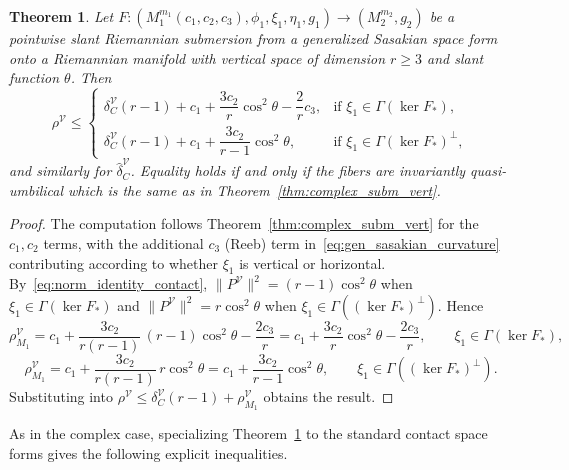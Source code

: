 \documentclass[11pt]{amsart}
\theoremstyle{plain}
\newtheorem{theorem}{Theorem}[section]
\theoremstyle{definition}
\theoremstyle{remark}
\newcommand{\calV}{\mathcal{V}}
\begin{document}
\begin{theorem}\label{thm:sasakian_subm_vert}
Let $F:(M_1^{m_1}(c_1,c_2,c_3),\phi_1,\xi_1,\eta_1,g_1)\to (M_2^{m_2},g_2)$ be a pointwise slant Riemannian submersion from a generalized Sasakian space form onto a Riemannian manifold with vertical space of dimension $r\ge 3$ and slant function $\theta$. Then
\begin{equation}\label{eq:sasakian_subm_vert}
\rho^{\calV} \le \begin{cases}
\delta_C^{\calV}(r-1) + c_1 + \dfrac{3c_2}{r}\cos^2\theta - \dfrac{2}{r}c_3, & \text{if } \xi_1 \in \Gamma(\ker F_*),\\[6pt]
\delta_C^{\calV}(r-1) + c_1 + \dfrac{3c_2}{r-1}\cos^2\theta, & \text{if } \xi_1 \in \Gamma(\ker F_*)^\perp,
\end{cases}
\end{equation}
and similarly for $\hat{\delta}_C^{\calV}$. Equality holds if and only if the fibers are invariantly quasi-umbilical 
 which is the same as in 
Theorem~\ref{thm:complex_subm_vert}.
\end{theorem}
\begin{proof}
The computation follows Theorem~\ref{thm:complex_subm_vert} for the
$c_1,c_2$ terms, with the additional $c_3$ (Reeb) term
in~\eqref{eq:gen_sasakian_curvature} contributing according to whether
$\xi_1$ is vertical or horizontal. By~\eqref{eq:norm_identity_contact},
$\|P^{\calV}\|^2=(r-1)\cos^2\theta$ when $\xi_1\in\Gamma(\ker F_*)$ and
$\|P^{\calV}\|^2=r\cos^2\theta$ when $\xi_1\in\Gamma((\ker F_*)^{\perp})$.
Hence
\[
\rho_{M_1}^{\calV}
= c_1+\frac{3c_2}{r(r-1)}\,(r-1)\cos^2\theta-\frac{2c_3}{r}
= c_1+\frac{3c_2}{r}\cos^2\theta-\frac{2c_3}{r},
\qquad \xi_1\in\Gamma(\ker F_*),
\]
\[
\rho_{M_1}^{\calV}
= c_1+\frac{3c_2}{r(r-1)}\,r\cos^2\theta
= c_1+\frac{3c_2}{r-1}\cos^2\theta,
\qquad \xi_1\in\Gamma((\ker F_*)^{\perp}).
\]
Substituting into $\rho^{\calV}\leq\delta_C^{\calV}(r-1)
+\rho_{M_1}^{\calV}$ obtains the result.
\end{proof}

As in the complex case, specializing
Theorem~\ref{thm:sasakian_subm_vert} to the standard contact space forms
gives the following explicit inequalities.
\end{document}
